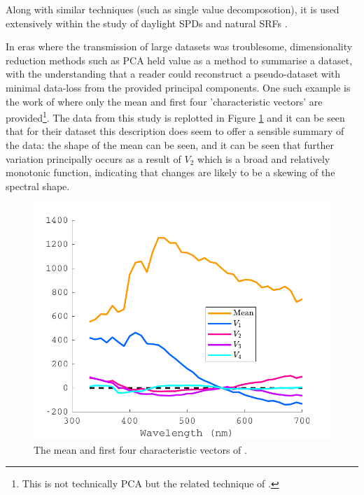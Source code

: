 Along with similar techniques (such as single value decomposotion), it is used extensively within the study of daylight \glspl{SPD} \citep{hernandez-andres_color_2001,ojeda_influence_2012,pant_estimating_2009,bui_group_2004,judd_spectral_1964,maloney_computational_1984,spitschan_variation_2016} and natural \glspl{SRF} \citep{maloney_computational_1984,dzmura_color_1992,maloney_evaluation_1986,maloney_color_1986,cohen_dependency_1964,ferrero_principal_2011,zhang_reconstructing_2008,kwon_surface_2007,agahian_reconstruction_2008,harifi_recovery_2008,parkkinen_characteristic_1989,vrhel_color_1992,fairman_principal_2004,ayala_use_2006,eem_reconstruction_1994-2,connah_multispectral_2006,shi_using_2002,morovic_metamer-set-based_2006}. 


In eras where the transmission of large datasets was troublesome, dimensionality reduction methods such as \gls{PCA} held value as a method to summarise a dataset, with the understanding that a reader could reconstruct a pseudo-dataset with minimal data-loss from the provided principal components. One such example is the work of \citet{judd_spectral_1964} where only the mean and first four 'characteristic vectors' are provided\footnote{This is not technically \gls{PCA} but the related technique of \citet{morris_objective_1954}.}. The data from this study is replotted in Figure \ref{fig:Judd} and it can be seen that for their dataset this description does seem to offer a sensible summary of the data: the shape of the mean can be seen, and it can be seen that further variation principally occurs as a result of $V_{2}$ which is a broad and relatively monotonic function, indicating that changes are likely to be a skewing of the spectral shape.

\begin{figure}[htbp]
 \includegraphics[max width=\textwidth]{figs/LitRev/Judd.pdf}
 \caption{The mean and first four characteristic vectors of \citet{judd_spectral_1964}.}
 \label{fig:Judd}
\end{figure} 